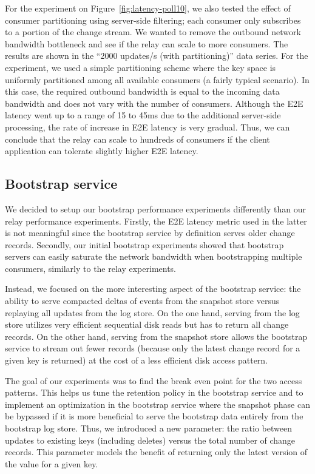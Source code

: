 For the experiment on Figure~\ref{fig:latency-poll10}, we also tested the effect of consumer partitioning using server-side filtering; each consumer only subscribes to a portion of the change stream. We wanted to remove the outbound network bandwidth bottleneck and see if the relay can scale to more consumers. The results are shown in the ``2000 updates/s (with partitioning)'' data series. For the experiment, we used a simple partitioning scheme where the key space is uniformly partitioned among all available consumers (a fairly typical scenario). In this case, the required outbound bandwidth is equal to the incoming data bandwidth and does not vary with the number of consumers. Although the E2E latency went up to a range of 15 to 45ms due to the additional server-side processing, the rate of increase in E2E latency is very gradual. Thus, we can conclude that the relay can scale to hundreds of consumers if the client application can tolerate slightly higher E2E latency.


\subsection{Bootstrap service}

We decided to setup our bootstrap performance experiments differently than our relay performance experiments. Firstly, the E2E latency metric used in the latter is not meaningful since the bootstrap service by definition serves older change records. Secondly, our initial bootstrap experiments showed that bootstrap servers can easily saturate the network bandwidth when bootstrapping multiple consumers, similarly to the relay experiments.

Instead, we focused on the more interesting aspect of the bootstrap service: the ability to serve compacted deltas of events from the snapshot store versus replaying all updates from the log store. 
On the one hand, serving from the log store utilizes very efficient sequential disk reads but has to return all change records. 
On the other hand, serving from the snapshot store allows the bootstrap service to stream out fewer records (because only the latest change record for a given key is returned) at the cost of a less efficient disk access pattern. 

The goal of our experiments was to find the break even point for the two access patterns. This helps us tune the retention policy in the bootstrap service and to implement an optimization in the bootstrap service where the snapshot phase can be bypassed if it is more beneficial to serve the bootstrap data entirely from the bootstrap log store. Thus, we introduced a new parameter: the ratio between updates to existing keys (including deletes) versus the total number of change records. This parameter models the benefit of returning only the latest version of the value for a given key. 

